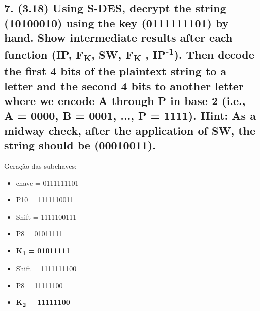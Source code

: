 \documentclass[12pt]{article}
\begin{document}
\subsection*{7. (3.18) Using S-DES, decrypt the string (10100010) using the key
(0111111101) by hand. Show intermediate results after each function (IP,
F\textsubscript{K}, SW, F\textsubscript{K} , IP\textsuperscript{-1}). Then
decode the first 4 bits of the plaintext string to a letter and the second 4
bits to another letter where we encode A through P in base 2 (i.e., A = 0000, B
= 0001, ..., P = 1111). Hint: As a midway check, after the application of SW,
the string should be (00010011).}

  Geração das subchaves:
  \begin{itemize}
    \item chave = 0111111101
    \item P10 = 1111110011
    \item Shift = 1111100111
    \item P8 = 01011111
    \item \textbf{K\textsubscript{1} = 01011111}
    \item Shift = 1111111100
    \item P8 = 11111100
    \item \textbf{K\textsubscript{2} = 11111100}
  \end{itemize}
\end{document}
